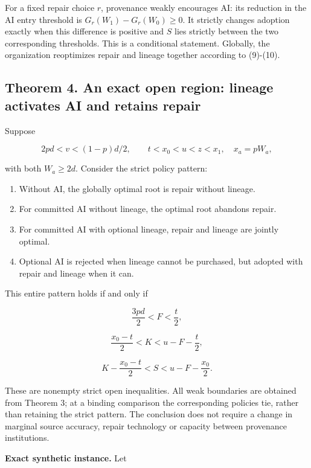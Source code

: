 \documentclass[
  11pt,
  a4paper,
]{article}
\providecommand{\tightlist}{%
  \setlength{\itemsep}{0pt}\setlength{\parskip}{0pt}}
\begin{document}
For a fixed repair choice \(r\), provenance weakly encourages AI: its
reduction in the AI entry threshold is \(G_r(W_1)-G_r(W_0)\geq0\). It
strictly changes adoption exactly when this difference is positive and
\(S\) lies strictly between the two corresponding thresholds. This is a
conditional statement. Globally, the organization reoptimizes repair and
lineage together according to (9)-(10).

\subsection{Theorem 4. An exact open region: lineage activates AI and
retains
repair}\label{theorem-4.-an-exact-open-region-lineage-activates-ai-and-retains-repair}

Suppose

\[2pd<v<(1-p)d/2,\qquad t<x_0<u<z<x_1,\quad x_a=pW_a,\tag{11}\]

with both \(W_a\geq2d\). Consider the strict policy pattern:

\begin{enumerate}
\def\labelenumi{\arabic{enumi}.}
\tightlist
\item
  Without AI, the globally optimal root is repair without lineage.
\item
  For committed AI without lineage, the optimal root abandons repair.
\item
  For committed AI with optional lineage, repair and lineage are jointly
  optimal.
\item
  Optional AI is rejected when lineage cannot be purchased, but adopted
  with repair and lineage when it can.
\end{enumerate}


This entire pattern holds if and only if

\[\frac{3pd}{2}<F<\frac t2,\tag{12}\]

\[\frac{x_0-t}{2}<K<u-F-\frac t2,\tag{13}\]

\[K-\frac{x_0-t}{2}<S<u-F-\frac{x_0}{2}.\tag{14}\]

These are nonempty strict open inequalities. All weak boundaries are
obtained from Theorem 3; at a binding comparison the corresponding
policies tie, rather than retaining the strict pattern. The conclusion
does not require a change in marginal source accuracy, repair technology
or capacity between provenance institutions.

\textbf{Exact synthetic instance.} Let
\end{document}

